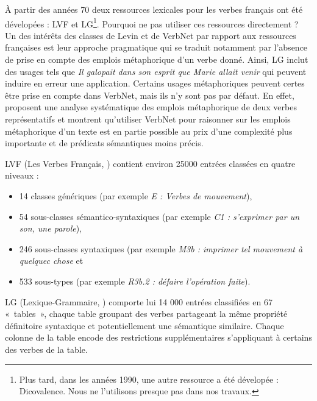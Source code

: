 À partir des années 70 deux ressources lexicales pour les verbes français ont
été dévelopées : LVF et LG\footnote{Plus tard, dans les années 1990, une autre
    ressource a été dévelopée : Dicovalence. Nous ne l'utilisons presque pas
dans nos travaux.}. Pourquoi ne pas utiliser ces ressources directement ?  Un
des intérêts des classes de Levin et de VerbNet par rapport aux ressources
françaises est leur approche pragmatique qui se traduit notamment par l'absence
de prise en compte des emplois métaphorique d'un verbe donné. Ainsi, LG inclut
des usages tels que \textit{Il galopait dans son esprit que Marie allait venir}
qui peuvent induire en erreur une application.  Certains usages métaphoriques
peuvent certes être prise en compte dans VerbNet, mais ils n'y sont pas par
défaut. En effet, \cite{brown2012semantic} proposent une analyse systématique
des emplois métaphorique de deux verbes représentatifs et montrent qu'utiliser
VerbNet pour raisonner sur les emplois métaphorique d'un texte est en partie
possible au prix d'une complexité plus importante et de prédicats sémantiques
moins précis.

LVF (Les Verbes Français, \cite{dubois1997verbes}) contient environ 25000
entrées classées en quatre niveaux :

\begin{itemize}

    \item 14 classes génériques (par exemple \emph{E : Verbes de mouvement}),

    \item 54 sous-classes sémantico-syntaxiques (par exemple \emph{C1 :
        s'exprimer par un son, une parole}),

    \item 246 sous-classes syntaxiques (par exemple \emph{M3b : imprimer tel
        mouvement à quelquec chose} et

    \item 533 sous-types (par exemple \emph{R3b.2 : défaire l'opération
        faite}).

\end{itemize}


LG (Lexique-Grammaire, \cite{gross1975methodes,boons1976structure}) comporte
lui 14 000 entrées classifiées en 67 «~tables~», chaque table groupant des
verbes partageant la même propriété définitoire syntaxique et potentiellement
une sémantique similaire. Chaque colonne de la table encode des restrictions
supplémentaires s'appliquant à certains des verbes de la table.

